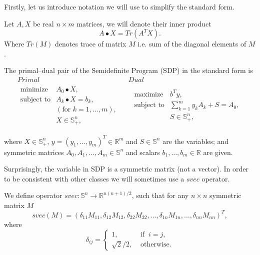 \documentclass[10pt,oneside]{book}
\theoremstyle{definition}
\begin{document}
Firstly, let us introduce notation we will use to simplify the standard form.

\label{defBullet}
Let $A,X$ be real $n\times m$ matrices, we will denote their inner product 
$$A\bullet X = Tr(A^TX).$$
Where $Tr(M)$ denotes trace of matrix $M$ i.e. sum of the diagonal elements of $M$.

\label{defSDP}
The primal--dual pair of the Semidefinite Program (SDP) in the standard form is
\begin{equation}
\label{sdp} 
\begin{array}{cc}
Primal & Dual \\
\begin{array}{ll}
\mbox{minimize} & A_0\bullet X,\\
\mbox{subject to}& A_k\bullet X  = b_k, \ \\
 & (\mbox{for } k = 1,\dots ,m), \\
& X \in \mathbb{S}^n_+,
\end{array}
\ \  &  \ \
\begin{array}{ll}
\mbox{maximize} & b^Ty, \\
\mbox{subject to}& \sum_{k=1}^m y_kA_k + S  = A_0 ,\\
& S \in \mathbb{S}^n_+,
\end{array}
\end{array}
\end{equation}

where $X\in \mathbb{S}^n_+$, $y = (y_1,\dots ,y_m)^T\in \mathbb{R}^m$ and $S\in \mathbb{S}^n$ are the variables; and symmetric matrices $A_0 , A_1,\dots , A_m \in \mathbb{S}^n$ and scalars $b_1,\dots, b_m \in \mathbb{R}$ are given.


Surprisingly, the variable in SDP is a symmetric matrix (not a vector). 
In order to be consistent with other classes we will sometimes use a $svec$ operator.  

 \label{svec}
We define operator $svec: \mathbb{S}^n \rightarrow \mathbb{R}^{n(n+1)/2}$, such that for any $n\times n$ symmetric matrix $M$
\begin{equation}
	svec(M) = ( \delta_{11}M_{11},\delta_{12}M_{12},\delta_{22}M_{22},\dots ,\delta_{1n}M_{1n},\dots ,\delta_{nn}M_{nn})^T,
\end{equation}
where
\begin{equation}
	\delta_{ij}= \left\lbrace 
	\begin{array}{ll} 
		1, &\mbox{ if }\ i=j, \\ 
		\sqrt{2}/2, &\mbox{ otherwise.} 
	\end{array} \right.
\end{equation}
\end{document}
